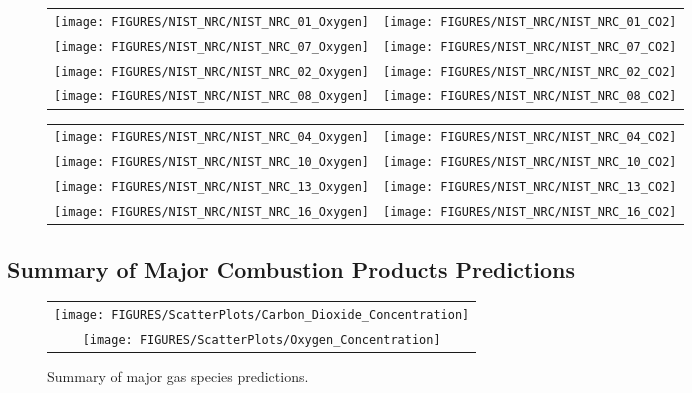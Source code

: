\begin{figure}[p]
\begin{tabular*}{\textwidth}{l@{\extracolsep{\fill}}r}
\texttt{[image: FIGURES/NIST\_NRC/NIST\_NRC\_01\_Oxygen]} &
\texttt{[image: FIGURES/NIST\_NRC/NIST\_NRC\_01\_CO2]} \\
\texttt{[image: FIGURES/NIST\_NRC/NIST\_NRC\_07\_Oxygen]} &
\texttt{[image: FIGURES/NIST\_NRC/NIST\_NRC\_07\_CO2]} \\
\texttt{[image: FIGURES/NIST\_NRC/NIST\_NRC\_02\_Oxygen]} &
\texttt{[image: FIGURES/NIST\_NRC/NIST\_NRC\_02\_CO2]} \\
\texttt{[image: FIGURES/NIST\_NRC/NIST\_NRC\_08\_Oxygen]} &
\texttt{[image: FIGURES/NIST\_NRC/NIST\_NRC\_08\_CO2]}
\end{tabular*}
\label{NIST_NRC_Gas_Closed_1}
\end{figure}

\begin{figure}[p]
\begin{tabular*}{\textwidth}{l@{\extracolsep{\fill}}r}
\texttt{[image: FIGURES/NIST\_NRC/NIST\_NRC\_04\_Oxygen]} &
\texttt{[image: FIGURES/NIST\_NRC/NIST\_NRC\_04\_CO2]} \\
\texttt{[image: FIGURES/NIST\_NRC/NIST\_NRC\_10\_Oxygen]} &
\texttt{[image: FIGURES/NIST\_NRC/NIST\_NRC\_10\_CO2]} \\
\texttt{[image: FIGURES/NIST\_NRC/NIST\_NRC\_13\_Oxygen]} &
\texttt{[image: FIGURES/NIST\_NRC/NIST\_NRC\_13\_CO2]} \\
\texttt{[image: FIGURES/NIST\_NRC/NIST\_NRC\_16\_Oxygen]} &
\texttt{[image: FIGURES/NIST\_NRC/NIST\_NRC\_16\_CO2]}
\end{tabular*}
\label{NIST_NRC_Gas_Closed_2}
\end{figure}

\clearpage

\subsection{Summary of Major Combustion Products Predictions}


\begin{figure}[h!]
\begin{center}
\begin{tabular}{c}
\texttt{[image: FIGURES/ScatterPlots/Carbon\_Dioxide\_Concentration]} \\
\texttt{[image: FIGURES/ScatterPlots/Oxygen\_Concentration]}\\
\end{tabular}
\end{center}
\caption[Summary of major gas species predictions]
{Summary of major gas species predictions.}
\end{figure}

